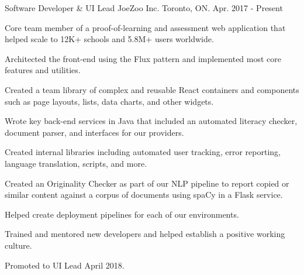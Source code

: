 

\begin{cventries}

  \cventry
    {Software Developer \& UI Lead} %
    {JoeZoo Inc.} %
    {Toronto, ON.} %
    {Apr. 2017 - Present} %
    {
      \begin{cvitems} %
        \item {Core team member of a proof-of-learning and assessment web application that helped scale to 12K+ schools and 5.8M+ users worldwide.}
        \item {Architected the front-end using the Flux pattern and implemented most core features and utilities.}
        \item {Created a team library of complex and reusable React containers and components such as page layouts, lists, data charts, and other widgets.}
        \item {Wrote key back-end services in Java that included an automated literacy checker, document parser, and interfaces for our providers.}
        \item {Created internal libraries including automated user tracking, error reporting, language translation, scripts, and more.}
        \item {Created an Originality Checker as part of our NLP pipeline to report copied or similar content against a corpus of documents using spaCy in a Flask service.}
        \item {Helped create deployment pipelines for each of our environments.}
        \item {Trained and mentored new developers and helped establish a positive working culture.}
        \item {Promoted to UI Lead April 2018.}
      \end{cvitems}
    }


\end{cventries}

